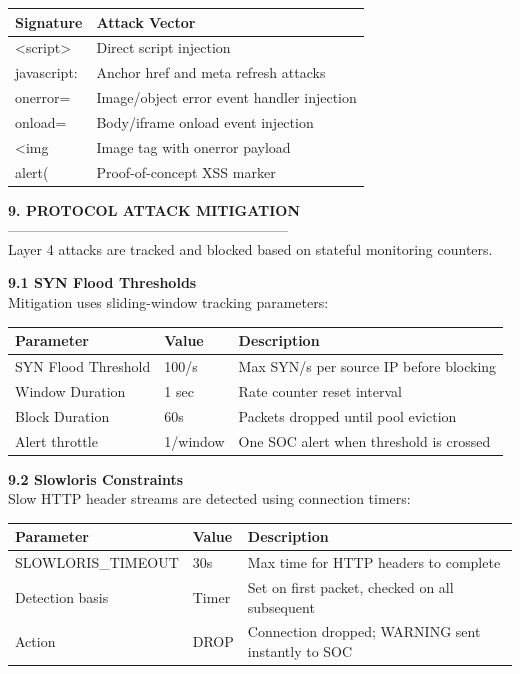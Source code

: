 \documentclass[12pt,a4paper]{article}
\newcommand{\thfmt}[1]{\textbf{#1}}
\begin{document}
\begin{center}
\begin{tabular}{L{4cm} L{10.5cm}}
\hline
\thfmt{Signature} & \thfmt{Attack Vector} \\
\hline
<script>     & Direct script injection \\
javascript:  & Anchor href and meta refresh attacks \\
onerror=     & Image/object error event handler injection \\
onload=      & Body/iframe onload event injection \\
<img         & Image tag with onerror payload \\
alert(       & Proof-of-concept XSS marker \\
\hline
\end{tabular}
\end{center}

\vspace{1.5em}
\textbf{9. PROTOCOL ATTACK MITIGATION}\\
------------------------------------------------------------\\
Layer 4 attacks are tracked and blocked based on stateful monitoring counters.

\textbf{9.1 SYN Flood Thresholds}\\
Mitigation uses sliding-window tracking parameters:

\begin{center}
\begin{tabular}{L{5cm} L{2.5cm} L{7cm}}
\hline
\thfmt{Parameter} & \thfmt{Value} & \thfmt{Description} \\
\hline
SYN Flood Threshold & 100/s   & Max SYN/s per source IP before blocking \\
Window Duration     & 1 sec   & Rate counter reset interval \\
Block Duration      & 60s     & Packets dropped until pool eviction \\
Alert throttle      & 1/window & One SOC alert when threshold is crossed \\
\hline
\end{tabular}
\end{center}

\textbf{9.2 Slowloris Constraints}\\
Slow HTTP header streams are detected using connection timers:

\begin{center}
\begin{tabular}{L{5cm} L{2.5cm} L{7cm}}
\hline
\thfmt{Parameter} & \thfmt{Value} & \thfmt{Description} \\
\hline
SLOWLORIS\_TIMEOUT & 30s & Max time for HTTP headers to complete \\
Detection basis    & Timer & Set on first packet, checked on all subsequent \\
Action             & DROP  & Connection dropped; WARNING sent instantly to SOC \\
\hline
\end{tabular}
\end{center}
\end{document}
